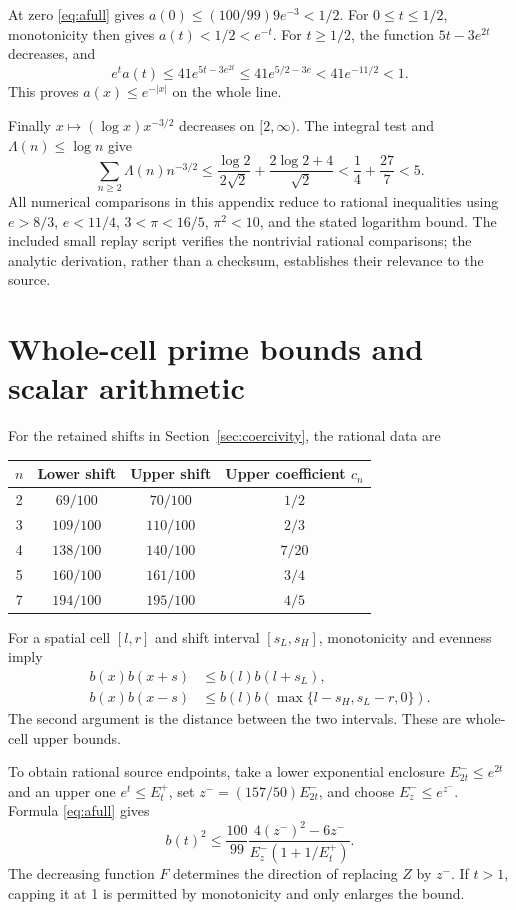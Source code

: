 \documentclass[11pt,a4paper]{article}
\numberwithin{equation}{section}
\theoremstyle{definition}\newtheorem{definition}[theorem]{Definition}
\theoremstyle{remark}\newtheorem{remark}[theorem]{Remark}
\begin{document}
At zero \eqref{eq:afull} gives $a(0)\le(100/99)9e^{-3}<1/2$. For $0\le t\le1/2$, monotonicity then gives $a(t)<1/2<e^{-t}$. For $t\ge1/2$, the function $5t-3e^{2t}$ decreases, and
\[
 e^ta(t)\le41e^{5t-3e^{2t}}
 \le41e^{5/2-3e}<41e^{-11/2}<1.
\]
This proves $a(x)\le e^{-|x|}$ on the whole line.

Finally $x\mapsto(\log x)x^{-3/2}$ decreases on $[2,\infty)$. The integral test and $\Lambda(n)\le\log n$ give
\begin{equation}
 \sum_{n\ge2}\Lambda(n)n^{-3/2}
 \le\frac{\log2}{2\sqrt2}+\frac{2\log2+4}{\sqrt2}
 <\frac14+\frac{27}{7}<5.
\end{equation}
All numerical comparisons in this appendix reduce to rational inequalities using $e>8/3$, $e<11/4$, $3<\pi<16/5$, $\pi^2<10$, and the stated logarithm bound. The included small replay script verifies the nontrivial rational comparisons; the analytic derivation, rather than a checksum, establishes their relevance to the source.

\section{Whole-cell prime bounds and scalar arithmetic}\label{app:scalar}
For the retained shifts in Section~\ref{sec:coercivity}, the rational data are
\begin{center}
\begin{tabular}{cccc}
\toprule
$n$&Lower shift&Upper shift&Upper coefficient $c_n$\\
\midrule
2&$69/100$&$70/100$&$1/2$\\
3&$109/100$&$110/100$&$2/3$\\
4&$138/100$&$140/100$&$7/20$\\
5&$160/100$&$161/100$&$3/4$\\
7&$194/100$&$195/100$&$4/5$\\
\bottomrule
\end{tabular}
\end{center}
For a spatial cell $[l,r]$ and shift interval $[s_L,s_H]$, monotonicity and evenness imply
\begin{align}
 b(x)b(x+s)&\le b(l)b(l+s_L),\\
 b(x)b(x-s)&\le b(l)b(\max\{l-s_H,s_L-r,0\}).
\end{align}
The second argument is the distance between the two intervals. These are whole-cell upper bounds.

To obtain rational source endpoints, take a lower exponential enclosure $E_{2t}^-\le e^{2t}$ and an upper one $e^t\le E_t^+$, set $z^-=(157/50)E_{2t}^-$, and choose $E_z^-\le e^{z^-}$. Formula \eqref{eq:afull} gives
\begin{equation}
 b(t)^2\le\frac{100}{99}
 \frac{4(z^-)^2-6z^-}{E_z^-(1+1/E_t^+)}.
\end{equation}
The decreasing function $F$ determines the direction of replacing $Z$ by $z^-$. If $t>1$, capping it at 1 is permitted by monotonicity and only enlarges the bound.
\end{document}
